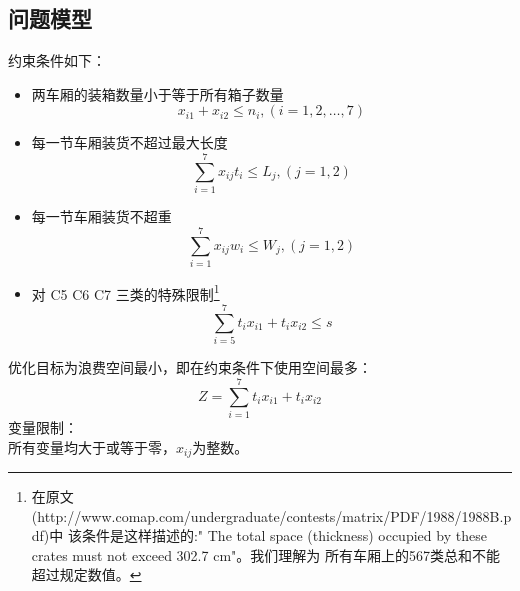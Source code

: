 \documentclass[11pt,a4paper]{article}
\begin{document}
\begin{CJK}{UTF8}{gkai}
	\subsection{问题模型}
	约束条件如下：
	\begin{itemize}
	\item 两车厢的装箱数量小于等于所有箱子数量
		\[ x_{i1} + x_{i2} \leqslant n_i , ( i = 1,2,\ldots,7) \]
	\item 每一节车厢装货不超过最大长度
		\[ \sum_{i=1}^7 x_{ij} t_i \leq L_j , (j = 1,2 ) \]
	\item 每一节车厢装货不超重
		\[ \sum_{i=1}^7 x_{ij} w_i \leq W_j , (j = 1,2) \]
	\item 对 C5 C6 C7 三类的特殊限制\footnote{在原文(http://www.comap.com/undergraduate/contests/matrix/PDF/1988/1988B.pdf)中
		该条件是这样描述的:" The total space (thickness) occupied by these crates must not exceed 302.7 cm"。我们理解为
		所有车厢上的567类总和不能超过规定数值。}
		\[ \sum_{i=5}^7 t_i x_{i1} + t_i x_{i2} \leq s \]
	\end{itemize}
	优化目标为浪费空间最小，即在约束条件下使用空间最多：
	\begin{equation}
		Z = \sum_{i=1}^7 t_i x_{i1} + t_i x_{i2}
	\end{equation}
	变量限制：\\
		所有变量均大于或等于零，$x_{ij}$为整数。


\end{CJK}
\end{document}
